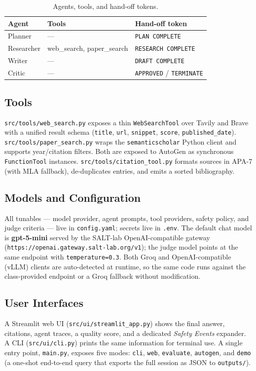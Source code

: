 \documentclass[conference]{IEEEtran}
\begin{document}
\begin{table}[t]
\centering
\caption{Agents, tools, and hand-off tokens.}
\label{tab:agents}
\renewcommand{\arraystretch}{1.15}
\begin{tabularx}{\columnwidth}{@{}lll@{}}
\toprule
\textbf{Agent} & \textbf{Tools} & \textbf{Hand-off token} \\
\midrule
Planner    & ---                         & \texttt{PLAN COMPLETE} \\
Researcher & web\_search, paper\_search  & \texttt{RESEARCH COMPLETE} \\
Writer     & ---                         & \texttt{DRAFT COMPLETE} \\
Critic     & ---                         & \texttt{APPROVED} / \texttt{TERMINATE} \\
\bottomrule
\end{tabularx}
\end{table}

\subsection{Tools}
\texttt{src/tools/web\_search.py} exposes a thin \texttt{WebSearchTool} over
Tavily and Brave with a unified result schema (\texttt{title}, \texttt{url},
\texttt{snippet}, \texttt{score}, \texttt{published\_date}).
\texttt{src/tools/paper\_search.py} wraps the \texttt{semanticscholar} Python
client and supports year/citation filters. Both are exposed to AutoGen as
synchronous \texttt{FunctionTool} instances.
\texttt{src/tools/citation\_tool.py} formats sources in APA-7 (with MLA
fallback), de-duplicates entries, and emits a sorted bibliography.

\subsection{Models and Configuration}
All tunables --- model provider, agent prompts, tool providers, safety policy,
and judge criteria --- live in \texttt{config.yaml}; secrets live in
\texttt{.env}. The default chat model is \textbf{gpt-5-mini} served by the
SALT-lab OpenAI-compatible gateway
(\texttt{https://openai.gateway.salt-lab.org/v1}); the judge model points at
the same endpoint with \texttt{temperature=0.3}. Both Groq and
OpenAI-compatible (vLLM) clients are auto-detected at runtime, so the same
code runs against the class-provided endpoint or a Groq fallback without
modification.

\subsection{User Interfaces}
A Streamlit web UI (\texttt{src/ui/streamlit\_app.py}) shows the final
answer, citations, agent traces, a quality score, and a dedicated
\emph{Safety Events} expander. A CLI (\texttt{src/ui/cli.py}) prints the same
information for terminal use. A single entry point, \texttt{main.py}, exposes
five modes: \texttt{cli}, \texttt{web}, \texttt{evaluate}, \texttt{autogen},
and \texttt{demo} (a one-shot end-to-end query that exports the full session
as JSON to \texttt{outputs/}).
\end{document}
